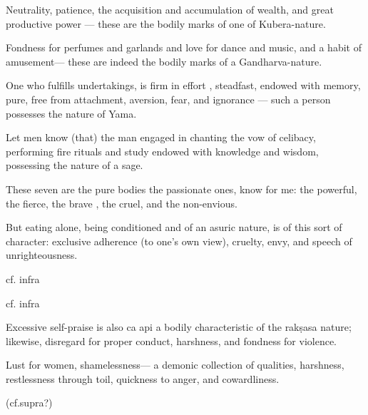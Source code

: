 \begin{translation}
\begin{tt}
\item[84]

Neutrality, patience, the acquisition and accumulation of wealth, and great productive power  — these are the bodily marks of one of Kubera-nature.

\item[85]

Fondness for perfumes and garlands  and love for dance and music, and a habit of amusement— these are indeed the bodily marks  of a Gandharva-nature.

\item[86]

One who fulfills undertakings, is firm in effort , steadfast, endowed with memory, pure, free from attachment, aversion, fear, and ignorance — such a person possesses the nature of Yama.

\item[87]

Let men know (that) the man engaged in chanting the vow of celibacy, performing fire rituals and study  endowed with knowledge and wisdom, possessing the nature of a sage.

\item[88]

These seven are the pure bodies  the passionate ones, know for me: the powerful, the fierce, the brave , the cruel, and the non-envious.

\item[89]

But eating alone, being conditioned and of an asuric nature, is of this sort of character: exclusive adherence (to one’s own view), cruelty, envy, and speech of unrighteousness.

\item[90]  cf. infra

\item[91] cf. infra

\item[92]

Excessive self-praise  is also ca api a bodily characteristic of the rakṣasa nature; likewise, disregard for proper conduct, harshness, and fondness for violence.


\item[93]

Lust for women, shamelessness— a demonic collection of qualities, harshness, restlessness  through toil, quickness to anger, and cowardliness.

\item[90] (cf.supra?)


\end{tt}
\end{translation}
